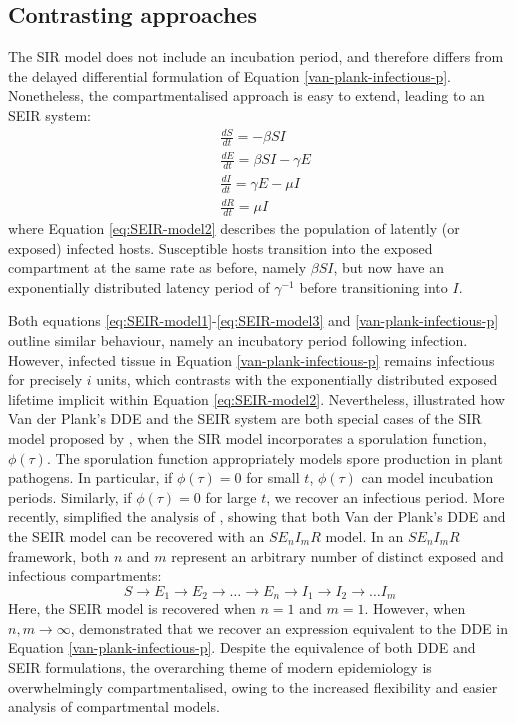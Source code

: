 \subsection{Contrasting approaches}
\label{sec:SIR-vs-plank}

The SIR model does not include an incubation period, and therefore differs from the delayed differential formulation 
of Equation \ref{van-plank-infectious-p}. Nonetheless, the compartmentalised approach is easy to extend, leading to an 
SEIR system:
\begin{align}
\label{eq:SEIR-model1}
    &\frac{dS}{dt} = -\beta SI \\
\label{eq:SEIR-model2}
    &\frac{dE}{dt} = \beta SI - \gamma E\\
    &\frac{dI}{dt} = \gamma E - \mu I \\
    \label{eq:SEIR-model3}
    &\frac{dR}{dt} = \mu I
\end{align}
where Equation \ref{eq:SEIR-model2} describes the population of latently (or exposed) infected hosts.
Susceptible hosts transition into the exposed compartment at the same rate as before, namely $\beta SI$, but now have an
exponentially distributed latency period of $\gamma^{-1}$ before transitioning into $I$.

Both equations \ref{eq:SEIR-model1}-\ref{eq:SEIR-model3} and \ref{van-plank-infectious-p} outline similar behaviour, namely an incubatory period following infection. However, infected tissue in Equation \ref{van-plank-infectious-p} remains infectious for precisely $i$ units, which contrasts with the exponentially distributed exposed lifetime implicit within Equation \ref{eq:SEIR-model2}.
Nevertheless, \cite{segarra2001epidemic} illustrated how Van der Plank's DDE and the SEIR system are both special cases of
the SIR model proposed by \cite{kermack-model}, when the SIR model incorporates a sporulation function, $\phi(\tau)$. 
The sporulation function appropriately models spore production in plant pathogens. 
In particular, if $\phi(\tau) = 0$ for small $t$, $\phi(\tau)$ can model incubation periods. 
Similarly, if $\phi(\tau) = 0$  for large $t$, we recover an infectious period. 
More recently, \cite{time-varying-infectivity} simplified the analysis of \cite{segarra2001epidemic}, showing that 
both Van der Plank's DDE and the SEIR model can be recovered with an $SE_nI_mR$ model.
In an $SE_nI_mR$ framework, both $n$ and $m$ represent an arbitrary number of distinct exposed and infectious compartments:
\[
    S\rightarrow E_1 \rightarrow E_2 \rightarrow \hdots \rightarrow E_n \rightarrow I_1 \rightarrow I_2 \rightarrow \hdots I_m
\]
Here, the SEIR model is recovered when $n=1$ and $m=1$. However, when $n,m \rightarrow \infty$,
\cite{time-varying-infectivity} demonstrated that we recover an expression equivalent to the DDE in Equation \ref{van-plank-infectious-p}.
Despite the equivalence of both DDE and SEIR formulations, the overarching theme of modern epidemiology is overwhelmingly compartmentalised,
owing to the increased flexibility and easier analysis of compartmental models.


